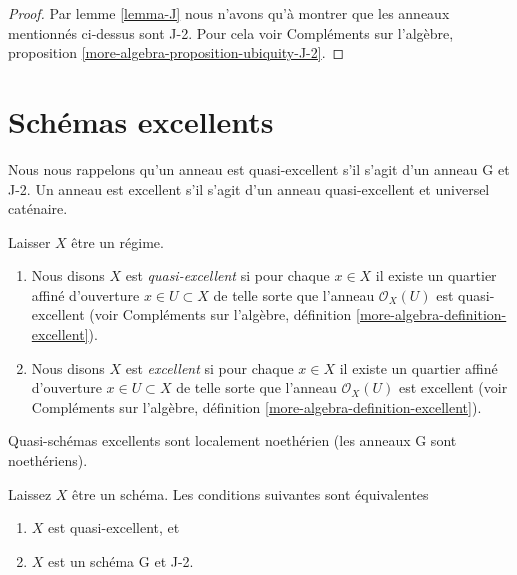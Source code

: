 \begin{proof}
Par lemme \ref{lemma-J} nous n'avons qu'à montrer que les anneaux mentionnés ci-dessus sont J-2. Pour cela voir Compléments sur l'algèbre, proposition \ref{more-algebra-proposition-ubiquity-J-2}.
\end{proof}




\section{Schémas excellents}
\label{section-excellent}

\noindent
Nous nous rappelons qu'un anneau est quasi-excellent s'il s'agit d'un anneau G et J-2. Un anneau est excellent s'il s'agit d'un anneau quasi-excellent et universel caténaire.

\begin{definition}

\label{definition-excellent}

Laisser $X$ être un régime.

\begin{enumerate}

\item Nous disons $X$ est {\it quasi-excellent} si pour chaque $x \in X$ il existe un quartier affiné d'ouverture $x \in U \subset X$ de telle sorte que l'anneau
$\mathcal{O}_X(U)$ est quasi-excellent (voir Compléments sur l'algèbre, définition \ref{more-algebra-definition-excellent}).
\item Nous disons $X$ est {\it excellent} si pour chaque $x \in X$ il existe un quartier affiné d'ouverture $x \in U \subset X$ de telle sorte que l'anneau
$\mathcal{O}_X(U)$ est excellent (voir Compléments sur l'algèbre, définition \ref{more-algebra-definition-excellent}).

\end{enumerate}

\end{definition}

\noindent
Quasi-schémas excellents sont localement noethérien (les anneaux G sont noethériens).

\begin{lemma}

\label{lemma-characterize-quasi-excellent}
Laissez $X$ être un schéma. Les conditions suivantes sont équivalentes
\begin{enumerate}
\item $X$ est quasi-excellent, et
\item $X$ est un schéma G et J-2.
\end{enumerate}

\end{lemma}

